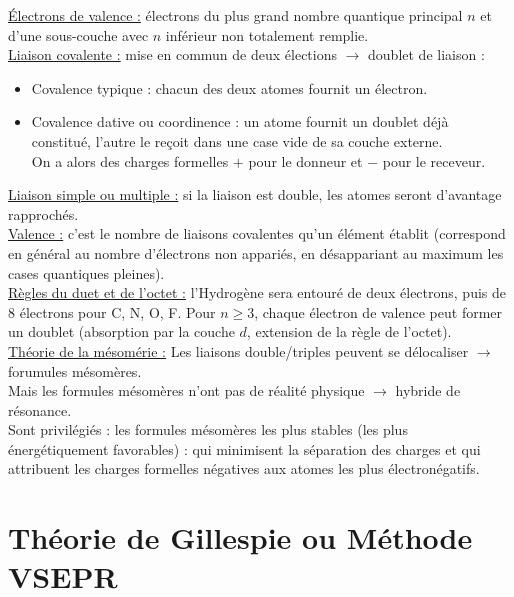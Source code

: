 \documentclass[13pt, twoside, a4paper, french, tikz]{report}
\begin{document}
    \underline{Électrons de valence :} électrons du plus grand nombre quantique principal $n$ et d'une sous-couche avec $n$ inférieur non totalement remplie.\\
    
    \underline{Liaison covalente :} mise en commun de deux élections $\rightarrow$ doublet de liaison :
    \begin{itemize}
      \item Covalence typique : chacun des deux atomes fournit un électron.
      \item Covalence dative ou coordinence : un atome fournit un doublet déjà constitué, l'autre le reçoit dans une case vide de sa couche externe.\\
      On a alors des charges formelles $+$ pour le donneur et $-$ pour le receveur.\\
    \end{itemize}
    
    \underline{Liaison simple ou multiple :} si la liaison est double, les atomes seront d'avantage rapprochés.\\
    
    \underline{Valence :} c'est le nombre de liaisons covalentes qu'un élément établit (correspond en général au nombre d'électrons non appariés, en désappariant au maximum les cases quantiques pleines).\\
    
    \underline{Règles du duet et de l'octet :} l'Hydrogène sera entouré de deux électrons, puis de 8 électrons pour C, N, O, F.
    Pour $n \ge 3$, chaque électron de valence peut former un doublet (absorption par la couche $d$, extension de la règle de l'octet).\\
    
    \underline{Théorie de la mésomérie :} Les liaisons double/triples peuvent se délocaliser $\rightarrow$ forumules mésomères.\\
    Mais les formules mésomères n'ont pas de réalité physique $\rightarrow$ hybride de résonance.\\
    Sont privilégiés : les formules mésomères les plus stables (les plus énergétiquement favorables) : qui minimisent la séparation des charges et qui attribuent les charges formelles négatives aux atomes les plus électronégatifs.
  
  
  \section{Théorie de Gillespie ou Méthode VSEPR}\label{sec:theorie-de-gillespie-ou-methode-vsepr}
    
\end{document}
